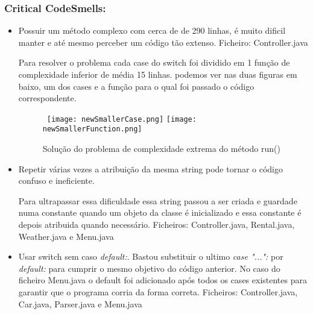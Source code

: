 \subsubsection{Critical CodeSmells:}
\begin{itemize}
\item Possuir um método complexo com cerca de de 290 linhas, é muito dificil manter e até mesmo perceber um código tão extenso.\newline
 Ficheiro: Controller.java\newline

\par Para resolver o problema cada case do switch foi dividido em 1 função de complexidade inferior de média 15 linhas. podemos ver nas duas figuras em baixo, um dos cases e a função para o qual foi passado o código correspondente.

\begin{figure}[H]

  \hbox{\hspace{+1em}  \texttt{[image: newSmallerCase.png]}}
  \centering
  \texttt{[image: newSmallerFunction.png]}
  \caption {Solução do problema de complexidade extrema do método run()}

  \label {fig9}

\end{figure}
\end{itemize}

\begin{itemize}
\item Repetir várias vezes a atribuição da mesma string pode tornar o código confuso e ineficiente. \newline
\par Para ultrapassar essa dificuldade essa string passou a ser criada e guardade numa constante quando um objeto da classe é inicializado e essa constante é depois atribuida quando necessário. \newline
 Ficheiros: Controller.java, Rental.java, Weather.java e Menu.java\newline
\end{itemize}

\begin{itemize}
\item Usar switch sem caso \textit{default:}. Bastou substituir o ultimo \textit{case "...":} por \textit{default:} para cumprir o mesmo objetivo do código anterior. No caso do ficheiro Menu.java o default foi adicionado após todos os cases existentes para garantir que o programa corria da forma correta.
 Ficheiros: Controller.java, Car.java, Parser.java e Menu.java\newline
\end{itemize}

